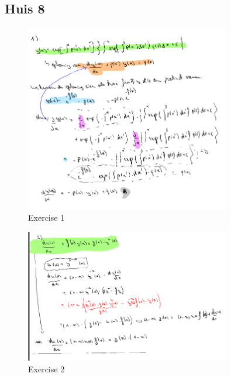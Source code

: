 \documentclass[a4paper]{report}
\begin{document}
\subsection*{Huis 8}

\begin{figure}[H]
	\centering
	\includegraphics[width=0.8\textwidth]{assets/exercise_1_huis_8.png}
	\caption{Exercise 1}
	\label{fig:exercise_1_huis_8}
\end{figure}

\begin{figure}[H]
	\centering
	\includegraphics[width=0.8\textwidth]{assets/exercise_2_huis_8.png}
	\caption{Exercise 2}
	\label{fig:exercise_2_huis_8}
\end{figure}
\end{document}

